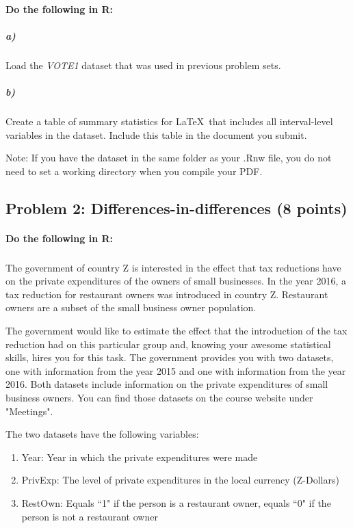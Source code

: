 \documentclass[12pt]{article}
\begin{document}
\paragraph{Do the following in R:}

\subparagraph{a)} Load the \textit{VOTE1} dataset that was used in previous problem sets.

\subparagraph{b)} Create a table of summary statistics for \LaTeX \ that includes all interval-level variables in the dataset. Include this table in the document you submit.

Note: If you have the dataset in the same folder as your .Rnw file, you do not need to set a working directory when you compile your PDF.



\subsection*{Problem 2: Differences-in-differences (8 points)}

\paragraph{Do the following in R:}

\subparagraph{} The government of country Z is interested in the effect that tax reductions have on the private expenditures of the owners of small businesses. In the year 2016, a tax reduction for restaurant owners was introduced in country Z. Restaurant owners are a subset of the small business owner population.

The government would like to estimate the effect that the introduction of the tax reduction had on this particular group and, knowing your awesome statistical skills, hires you for this task. The government provides you with two datasets, one with information from the year 2015 and one with information from the year 2016. Both datasets include information on the private expenditures of small business owners. You can find those datasets on the course website under "Meetings".

The two datasets have the following variables:

\begin{enumerate}
	\item Year: Year in which the private expenditures were made
	\item PrivExp: The level of private expenditures in the local currency (Z-Dollars)
	\item RestOwn: Equals ``1" if the person is a restaurant owner, equals ``0" if the person is not a restaurant owner
\end{enumerate}
\end{document}

